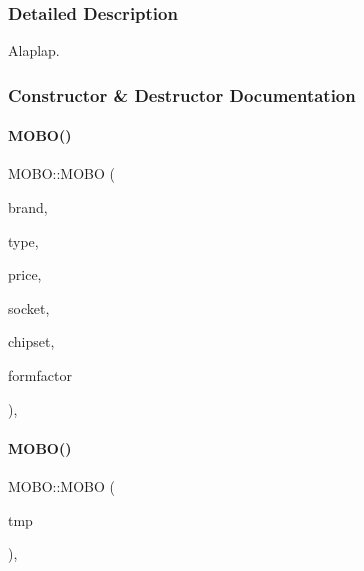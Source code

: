 \subsubsection{Detailed Description}
Alaplap. 

\subsubsection{Constructor \& Destructor Documentation}
\mbox{\label{class_m_o_b_o_a3185de871765391ae3a0ffe4b0af7e5b}} 
\paragraph{\texorpdfstring{MOBO()}{MOBO()}\hspace{0.1cm}{\footnotesize\ttfamily [1/2]}}
{\footnotesize\ttfamily M\+O\+B\+O\+::\+M\+O\+BO (\begin{DoxyParamCaption}\item[{\mbox{\hyperlink{class_string}{String}}}]{brand,  }\item[{\mbox{\hyperlink{class_string}{String}}}]{type,  }\item[{int}]{price,  }\item[{\mbox{\hyperlink{class_string}{String}}}]{socket,  }\item[{\mbox{\hyperlink{class_string}{String}}}]{chipset,  }\item[{\mbox{\hyperlink{class_string}{String}}}]{formfactor }\end{DoxyParamCaption})\hspace{0.3cm}{\ttfamily [inline]}, {\ttfamily [explicit]}}

\mbox{\label{class_m_o_b_o_ad6b4b2daac75d63d5d7f490d3cfeee6f}} 
\paragraph{\texorpdfstring{MOBO()}{MOBO()}\hspace{0.1cm}{\footnotesize\ttfamily [2/2]}}
{\footnotesize\ttfamily M\+O\+B\+O\+::\+M\+O\+BO (\begin{DoxyParamCaption}\item[{\mbox{\hyperlink{struct_temp_input}{Temp\+Input}}}]{tmp }\end{DoxyParamCaption})\hspace{0.3cm}{\ttfamily [inline]}, {\ttfamily [explicit]}}



